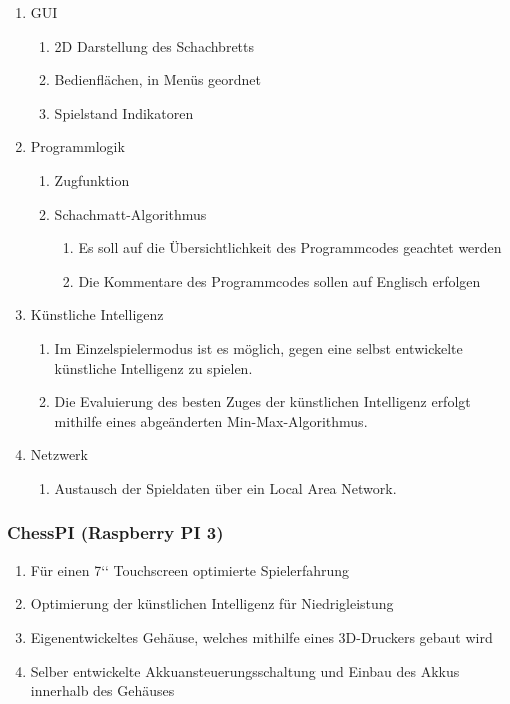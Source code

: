 \documentclass[12pt,a4paper]{article}
\begin{document}
\begin{enumerate}
	\item{GUI}
	\begin{enumerate}
		\item{2D Darstellung des Schachbretts}
		\item{Bedienflächen, in Menüs geordnet}
		\item{Spielstand Indikatoren}
	\end{enumerate}
	\item{Programmlogik}
	\begin{enumerate}
		\item{Zugfunktion}
		\item{Schachmatt-Algorithmus}
		\begin{enumerate}
			\item{Es soll auf die Übersichtlichkeit des Programmcodes geachtet werden}
			\item{Die Kommentare des Programmcodes sollen auf Englisch erfolgen}
		\end{enumerate}
	\end{enumerate}
	\item{Künstliche Intelligenz}
	\begin{enumerate}
		\item{Im Einzelspielermodus ist es möglich, gegen eine selbst entwickelte künstliche Intelligenz zu spielen.}
		\item{Die Evaluierung des besten Zuges der künstlichen Intelligenz erfolgt mithilfe eines abgeänderten Min-Max-Algorithmus.}
	\end{enumerate}
	\item{Netzwerk}
	\begin{enumerate}
		\item{Austausch der Spieldaten über ein Local Area Network.}
	\end{enumerate}
\end{enumerate}

\subsubsection{ChessPI (Raspberry PI 3)}

\begin{enumerate}
	\item{Für einen 7‘‘ Touchscreen optimierte Spielerfahrung}
	\item{Optimierung der künstlichen Intelligenz für Niedrigleistung}
	\item{Eigenentwickeltes Gehäuse, welches mithilfe eines 3D-Druckers gebaut wird}
	\item{Selber entwickelte Akkuansteuerungsschaltung und Einbau des Akkus innerhalb des Gehäuses}
\end{enumerate}
\end{document}
